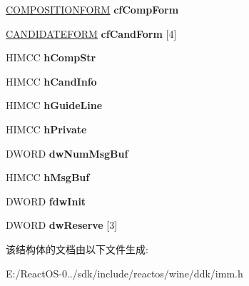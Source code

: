 \begin{DoxyCompactItemize}
\begin{tabbing}
\end{tabbing}\item 
\mbox{\label{struct__tag_i_n_p_u_t_c_o_n_t_e_x_t_a19dccbeed2baa54ceb2ee405cdac3d14}} 
\hyperlink{struct_c_o_m_p_o_s_i_t_i_o_n_f_o_r_m}{C\+O\+M\+P\+O\+S\+I\+T\+I\+O\+N\+F\+O\+RM} {\bfseries cf\+Comp\+Form}
\item 
\mbox{\label{struct__tag_i_n_p_u_t_c_o_n_t_e_x_t_a4978eaccbaa9168081a54b9aa7a0f55f}} 
\hyperlink{struct_c_a_n_d_i_d_a_t_e_f_o_r_m}{C\+A\+N\+D\+I\+D\+A\+T\+E\+F\+O\+RM} {\bfseries cf\+Cand\+Form} \mbox{[}4\mbox{]}
\item 
\mbox{\label{struct__tag_i_n_p_u_t_c_o_n_t_e_x_t_a94daaa25f050a5d639c135d2143b5dc0}} 
H\+I\+M\+CC {\bfseries h\+Comp\+Str}
\item 
\mbox{\label{struct__tag_i_n_p_u_t_c_o_n_t_e_x_t_aced6a57a3f8e19f4b304d305554aa2f2}} 
H\+I\+M\+CC {\bfseries h\+Cand\+Info}
\item 
\mbox{\label{struct__tag_i_n_p_u_t_c_o_n_t_e_x_t_acf9f32a80cc7d46b0fd963340986c72e}} 
H\+I\+M\+CC {\bfseries h\+Guide\+Line}
\item 
\mbox{\label{struct__tag_i_n_p_u_t_c_o_n_t_e_x_t_a18a8cc850bfd0ac4aa7b9c4ae9301af9}} 
H\+I\+M\+CC {\bfseries h\+Private}
\item 
\mbox{\label{struct__tag_i_n_p_u_t_c_o_n_t_e_x_t_af2297e11060a6607e26c8498bbdd44ce}} 
D\+W\+O\+RD {\bfseries dw\+Num\+Msg\+Buf}
\item 
\mbox{\label{struct__tag_i_n_p_u_t_c_o_n_t_e_x_t_a63d21c8b48d11db203a0d6b07b296248}} 
H\+I\+M\+CC {\bfseries h\+Msg\+Buf}
\item 
\mbox{\label{struct__tag_i_n_p_u_t_c_o_n_t_e_x_t_a6e0b7b106ee2f56a66acdb8cf16445dd}} 
D\+W\+O\+RD {\bfseries fdw\+Init}
\item 
\mbox{\label{struct__tag_i_n_p_u_t_c_o_n_t_e_x_t_ac3ebb1233770edebe1119c3a333f933d}} 
D\+W\+O\+RD {\bfseries dw\+Reserve} \mbox{[}3\mbox{]}
\end{DoxyCompactItemize}


该结构体的文档由以下文件生成\+:\begin{DoxyCompactItemize}
\item 
E\+:/\+React\+O\+S-\/0../sdk/include/reactos/wine/ddk/imm.\+h\end{DoxyCompactItemize}

